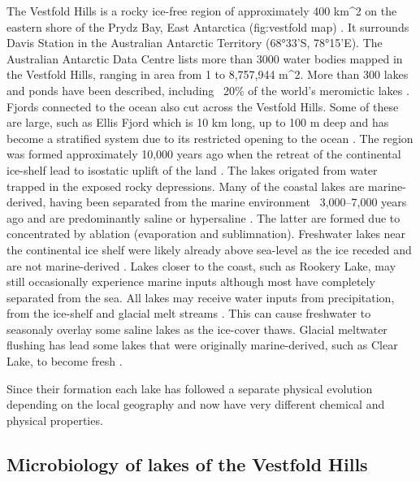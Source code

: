 \documentclass{book}
\begin{document}
The Vestfold Hills is a rocky ice-free region of approximately 400 km\^{}2 on the eastern shore of the Prydz Bay, East Antarctica (fig:vestfold map) \cite{Gibson1999}.
It surrounds Davis Station in the Australian Antarctic Territory (68°33'S, 78°15'E). 
The Australian Antarctic Data Centre lists more than 3000 water bodies mapped in the Vestfold Hills, ranging in area from 1 to 8,757,944 m\^{}2.
More than 300 lakes and ponds have been described, including ~20\% of the world's meromictic lakes \cite{Gibson, 1999}. 
Fjords connected to the ocean also cut across the Vestfold Hills. 
Some of these are large, such as Ellis Fjord which is 10 km long, up to 100 m deep and has become a stratified system due to its restricted opening to the ocean \cite{Burke1988}.
The region was formed approximately 10,000 years ago when the retreat of the continental ice-shelf lead to isostatic uplift of the land \cite{Burton1981}. 
The lakes origated from water trapped in the exposed rocky depressions.
Many of the coastal lakes are marine-derived, having been separated from the marine environment ~3,000–7,000 years ago \cite{Gibson1999} and are predominantly saline or hypersaline \cite{Burke1988}.
The latter are formed due to concentrated by ablation (evaporation and sublimnation).%
Freshwater lakes near the continental ice shelf were likely already above sea-level as the ice receded and are not marine-derived \cite{Laybourne-Parry1992} \cite{Bronge1996}.
Lakes closer to the coast, such as Rookery Lake, may still occasionally experience marine inputs although most have completely separated from the sea.%
All lakes may receive water inputs from precipitation, from the ice-shelf and glacial melt streams \cite{Burton1981}. 
This can cause freshwater to seasonaly overlay some saline lakes as the ice-cover thaws.
Glacial meltwater flushing has lead some lakes that were originally marine-derived, such as Clear Lake, to become fresh \cite{Pickard1986}\cite{Bird1991}.

Since their formation each lake has followed a separate physical evolution depending on the local geography and now have very different chemical and physical properties. 

\subsection{Microbiology of lakes of the Vestfold Hills}
\end{document}
